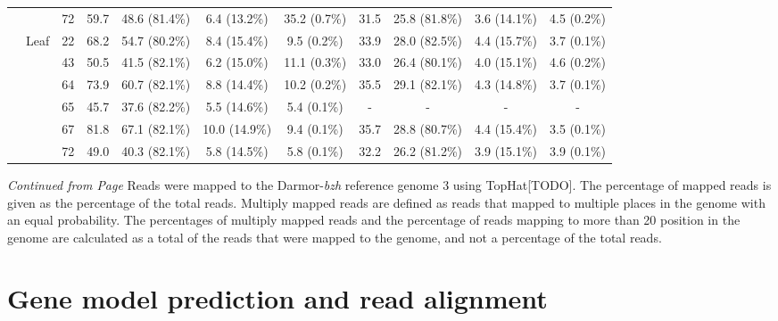 \documentclass[12pt,]{book}
\begin{document}
\begin{sidewaystable}[htp]
\begin{center}
{\begin{tabular}{ccccccccccc}
                          &                       & 72 & 59.7 & 48.6 (81.4\%) &  6.4 (13.2\%) & 35.2 (0.7\%) & 31.5 & 25.8 (81.8\%) & 3.6 (14.1\%) &   4.5 (0.2\%) \\
\cmidrule(lr){2-11}
                          & \multirow{6}{*}{Leaf} & 22 & 68.2 & 54.7 (80.2\%) &  8.4 (15.4\%) &  9.5 (0.2\%) & 33.9 & 28.0 (82.5\%) & 4.4 (15.7\%) &   3.7 (0.1\%) \\
                          &                       & 43 & 50.5 & 41.5 (82.1\%) &  6.2 (15.0\%) & 11.1 (0.3\%) & 33.0 & 26.4 (80.1\%) & 4.0 (15.1\%) &   4.6 (0.2\%) \\
                          &                       & 64 & 73.9 & 60.7 (82.1\%) &  8.8 (14.4\%) & 10.2 (0.2\%) & 35.5 & 29.1 (82.1\%) & 4.3 (14.8\%) &   3.7 (0.1\%) \\
                          &                       & 65 & 45.7 & 37.6 (82.2\%) &  5.5 (14.6\%) &  5.4 (0.1\%) &    - &            - &           - &            - \\
                          &                       & 67 & 81.8 & 67.1 (82.1\%) & 10.0 (14.9\%) &  9.4 (0.1\%) & 35.7 & 28.8 (80.7\%) & 4.4 (15.4\%) &   3.5 (0.1\%) \\
                          &                       & 72 & 49.0 & 40.3 (82.1\%) &  5.8 (14.5\%) &  5.8 (0.1\%) & 32.2 & 26.2 (81.2\%) & 3.9 (15.1\%) &   3.9 (0.1\%) \\
\bottomrule
\end{tabular}%
}
\end{center}
\end{sidewaystable}\addtocounter{table}{-1}

\begin{table}[t!]
\caption{\emph{Continued from Page \pageref{table:readdepth}} Reads were mapped to the Darmor-\emph{bzh} reference genome 3 using TopHat[TODO]. The percentage of mapped reads is given as the percentage of the total reads. Multiply mapped reads are defined as reads that mapped to multiple places in the genome with an equal probability. The percentages of multiply mapped reads and the percentage of reads mapping to more than 20 position in the genome are calculated as a total of the reads that were mapped to the genome, and not a percentage of the total reads.}%
\label{table:readdepthlegend}
\end{table}

\section{Gene model prediction and read
alignment}\label{gene-model-prediction-and-read-alignment}
\end{document}
